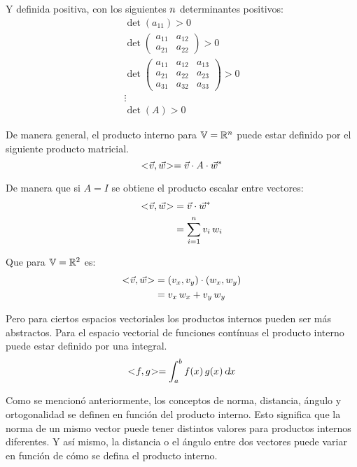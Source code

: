 Y definida positiva, con los siguientes $n$ determinantes positivos:
\begin{gather*}
    \operatorname{det}(a_{11})>0
    \\
    \operatorname{det}
    \begin{pmatrix}
        a_{11} & a_{12}
        \\
        a_{21} & a_{22}
    \end{pmatrix}
    >0
    \\
    \operatorname{det}
    \begin{pmatrix}
        a_{11} & a_{12} & a_{13}
        \\
        a_{21} & a_{22} & a_{23}
        \\
        a_{31} & a_{32} & a_{33}
    \end{pmatrix}
    >0
    \\
    \vdots
    \\
    \operatorname{det}(A)>0
\end{gather*}

De manera general, el producto interno para $\mathbb{V} = \mathbb{R}^n$ puede estar definido por el siguiente producto matricial.
\begin{equation*}
    <\hspace{-0.8mm}\Vec{v},\Vec{w}\hspace{-0.8mm}> = \Vec{v} \cdot A \cdot \Vec{w}^*
\end{equation*}

De manera que si $A=I$ se obtiene el producto escalar entre vectores:
\begin{align*}
    <\hspace{-0.8mm}\Vec{v},\Vec{w}\hspace{-0.8mm}> &= \Vec{v} \cdot \Vec{w}^*
    \\
    &= \sum_{i=1}^n v_i \, w_i
\end{align*}

Que para $\mathbb{V} = \mathbb{R}^2$ es:
\begin{align*}
    <\hspace{-0.8mm}\Vec{v},\Vec{w}\hspace{-0.8mm}> &= (v_x,v_y) \cdot (w_x,w_y)
    \\
    &= v_x \, w_x + v_y \, w_y
\end{align*}

Pero para ciertos espacios vectoriales los productos internos pueden ser más abstractos.
Para el espacio vectorial de funciones contínuas el producto interno puede estar definido por una integral.
\begin{equation*}
    <\hspace{-0.8mm}f,g\hspace{-0.8mm}> = \int_a^b f(x) \, g(x) \, \textsl{d} x
\end{equation*}

Como se mencionó anteriormente, los conceptos de norma, distancia, ángulo y ortogonalidad se definen en función del producto interno.
Esto significa que la norma de un mismo vector puede tener distintos valores para productos internos diferentes.
Y así mismo, la distancia o el ángulo entre dos vectores puede variar en función de cómo se defina el producto interno.

